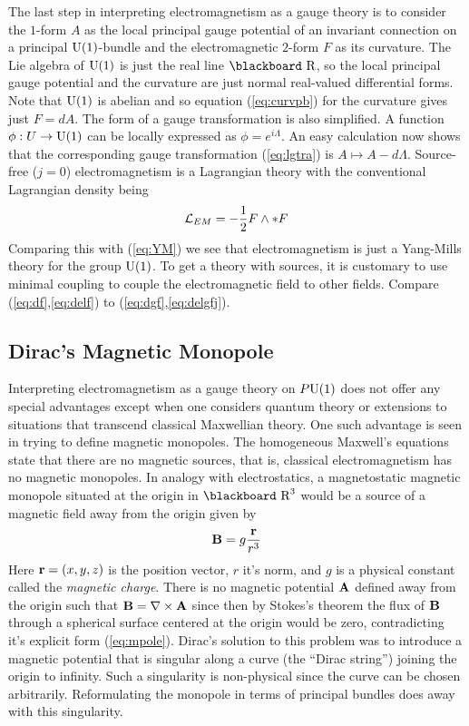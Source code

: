 \documentclass[12pt,titlepage]{article}
\def\bbf#1{\hbox{\blackboard #1}}
\def\lR{\bbf R}
\def\cL{{\cal L}}
\def\U{\hbox{U}}
\begin{document}
The last step in interpreting electromagnetism as a gauge theory is to
consider the \(1\)-form \(A\) as the local principal gauge potential of
an invariant connection on a principal \(\U(1)\)-bundle and the
electromagnetic \(2\)-form \(F\) as its curvature. 
The Lie algebra of \(\U(1)\) is just the real line \(\lR\), so the local
principal gauge potential and the curvature are just normal real-valued
differential forms.
Note that \(\U(1)\) is 
abelian and so equation (\ref{eq:curvpb}) for the curvature 
gives just \(F=dA\). The form of  a gauge transformation is also simplified.
 A function
\(\phi:U \to \U(1)\) can be locally expressed as \(\phi =
e^{i\Lambda}\). An easy calculation now shows that the corresponding
gauge transformation (\ref{eq:lgtra}) is \(A \mapsto A -d\Lambda\).
Source-free (\(j=0\)) electromagnetism is a Lagrangian theory
with the conventional Lagrangian density being
\[
\cL_{EM}= -\frac{1}{2}F\wedge *F
\]
Comparing this with (\ref{eq:YM}) we see that electromagnetism is just
a Yang-Mills theory for the group \(\U(1)\). To get a theory with
sources, it is customary to use minimal coupling to couple the
electromagnetic field to other fields. Compare
(\ref{eq:df},\ref{eq:delf}) to (\ref{eq:dgf},\ref{eq:delgfj}). 

\subsection{Dirac's Magnetic Monopole}%

Interpreting electromagnetism as a gauge theory on \(P\U(1)\) does not
offer any special advantages except when one considers quantum theory or
extensions to situations that transcend classical Maxwellian theory. One
such advantage is seen in trying to define magnetic monopoles. The
homogeneous Maxwell's equations state that there are no magnetic
sources, that is, classical electromagnetism has no magnetic monopoles.
%
 In analogy with electrostatics, a magnetostatic 
magnetic monopole situated at the origin in \(\lR^3\) would be a source of
a magnetic field away from the origin given by 
\begin{equation}\label{eq:mpole}%
{\bf B} = g\frac{{\bf r}}{r^3}
\end{equation}%
Here \({\bf r}=(x,y,z)\) is the position vector,  \(r\) it's norm, and
\(g\) is a physical constant called the  {\em magnetic charge\/}.
%
There is no magnetic potential \({\bf A}\) defined away from the origin
such that \({\bf B}={\bf \nabla}\times {\bf A}\) since then by Stokes's
theorem the flux of \({\bf B}\) through a spherical surface centered at
the origin would be zero, contradicting it's explicit form 
(\ref{eq:mpole}). Dirac's solution to this problem was to introduce a
magnetic potential that is singular along a curve (the ``Dirac string'')
joining the origin to infinity. Such a singularity is non-physical
since the curve can be chosen arbitrarily. Reformulating the monopole in
terms of principal bundles does away with this singularity. 
\end{document}
